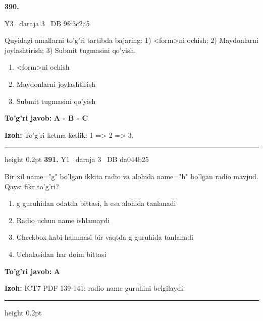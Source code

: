 \documentclass[10pt,a4paper,oneside]{article}
\begin{document}
\hypertarget{q390}{\textbf{\color{ink}390.}}  {\color{muted}\scriptsize Y3 \textbullet\ daraja 3 \textbullet\ DB 9fc3c2a5}
\par
Quyidagi amallarni to'g'ri tartibda bajaring: 1) \textless{}form\textgreater{}ni ochish; 2) Maydonlarni joylashtirish; 3) Submit tugmasini qo'yish.
\begin{enumerate}[label=\Alph*),leftmargin=9mm]
\item \textless{}form\textgreater{}ni ochish
\item Maydonlarni joylashtirish
\item Submit tugmasini qo'yish
\end{enumerate}
\begin{tcolorbox}[enhanced,breakable,colback=teal!4,colframe=teal!45!black,boxrule=0.45pt,arc=1.2mm,left=2.8mm,right=2.8mm,top=2mm,bottom=2mm,before skip=2mm,after skip=2mm]
\textbf{\color{teal}To'g'ri javob:} \textbf{A - B - C}
\par\smallskip
\textbf{Izoh:} To'g'ri ketma-ketlik: 1 =\textgreater{} 2 =\textgreater{} 3.
\end{tcolorbox}
\vspace{2mm}\hrule height 0.2pt \vspace{4mm}
\hypertarget{q391}{\textbf{\color{ink}391.}}  {\color{muted}\scriptsize Y1 \textbullet\ daraja 3 \textbullet\ DB da044b25}
\par
Bir xil name="g" bo'lgan ikkita radio va alohida name="h" bo'lgan radio mavjud. Qaysi fikr to'g'ri?
\begin{enumerate}[label=\Alph*),leftmargin=9mm]
\item g guruhidan odatda bittasi, h esa alohida tanlanadi
\item Radio uchun name ishlamaydi
\item Checkbox kabi hammasi bir vaqtda g guruhida tanlanadi
\item Uchalasidan har doim bittasi
\end{enumerate}
\begin{tcolorbox}[enhanced,breakable,colback=teal!4,colframe=teal!45!black,boxrule=0.45pt,arc=1.2mm,left=2.8mm,right=2.8mm,top=2mm,bottom=2mm,before skip=2mm,after skip=2mm]
\textbf{\color{teal}To'g'ri javob:} \textbf{A}
\par\smallskip
\textbf{Izoh:} ICT7 PDF 139-141: radio name guruhini belgilaydi.
\end{tcolorbox}
\vspace{2mm}\hrule height 0.2pt \vspace{4mm}
\end{document}
